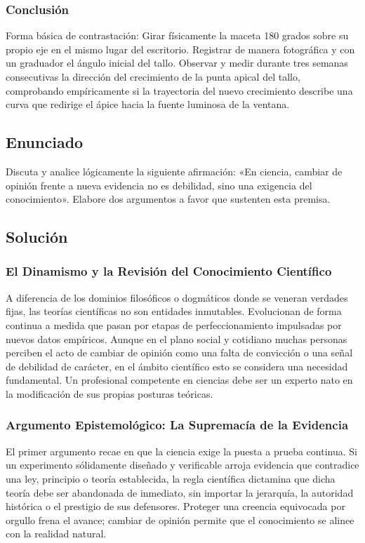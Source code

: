 \documentclass[12pt, a4paper]{article}
\begin{document}
\subsubsection*{Conclusión}
Forma básica de contrastación: Girar físicamente la maceta 180 grados sobre su propio eje en el mismo lugar del escritorio. Registrar de manera fotográfica y con un graduador el ángulo inicial del tallo. Observar y medir durante tres semanas consecutivas la dirección del crecimiento de la punta apical del tallo, comprobando empíricamente si la trayectoria del nuevo crecimiento describe una curva que redirige el ápice hacia la fuente luminosa de la ventana.

\newpage

\subsection*{Enunciado}
Discuta y analice lógicamente la siguiente afirmación: «En ciencia, cambiar de opinión frente a nueva evidencia no es debilidad, sino una exigencia del conocimiento». Elabore dos argumentos a favor que sustenten esta premisa.

\subsection*{Solución}

\subsubsection*{El Dinamismo y la Revisión del Conocimiento Científico}
A diferencia de los dominios filosóficos o dogmáticos donde se veneran verdades fijas, las teorías científicas no son entidades inmutables. Evolucionan de forma continua a medida que pasan por etapas de perfeccionamiento impulsadas por nuevos datos empíricos. Aunque en el plano social y cotidiano muchas personas perciben el acto de cambiar de opinión como una falta de convicción o una señal de debilidad de carácter, en el ámbito científico esto se considera una necesidad fundamental. Un profesional competente en ciencias debe ser un experto nato en la modificación de sus propias posturas teóricas.

\subsubsection*{Argumento Epistemológico: La Supremacía de la Evidencia}
El primer argumento recae en que la ciencia exige la puesta a prueba continua. Si un experimento sólidamente diseñado y verificable arroja evidencia que contradice una ley, principio o teoría establecida, la regla científica dictamina que dicha teoría debe ser abandonada de inmediato, sin importar la jerarquía, la autoridad histórica o el prestigio de sus defensores. Proteger una creencia equivocada por orgullo frena el avance; cambiar de opinión permite que el conocimiento se alinee con la realidad natural.
\end{document}
